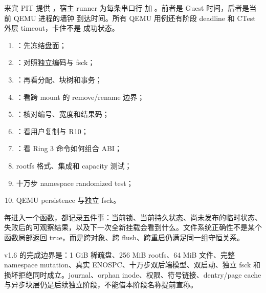 来宾 PIT 提供 ，宿主 runner 为每条串口行
加 \code{[QEMU][T+...ms]}。前者是 Guest 时间，后者是当前 QEMU 进程的墙钟
到达时间。所有 QEMU 用例还有阶段 deadline 和 CTest 外层 timeout，卡住不是
成功状态。

\par
\begin{enumerate}
  \item {}：先冻结盘面；
  \item {}：对照独立编码与 fsck；
  \item {}：再看分配、块树和事务；
  \item {}：看跨 mount 的 remove/rename 边界；
  \item {}：核对编号、宽度和结果码；
  \item {}：看用户复制与 R10；
  \item {}：看 Ring 3 命令如何组合 ABI；
  \item rootfs 格式、集成和 capacity 测试；
  \item 十万步 namespace randomized test；
  \item QEMU persistence 与独立 fsck。
\end{enumerate}

每进入一个函数，都记录五件事：当前锁、当前持久状态、尚未发布的临时状态、
失败后的可观察结果，以及下一次全新挂载会看到什么。文件系统正确性不是某个
函数局部返回 true，而是跨对象、跨 flush、跨重启仍满足同一组守恒关系。

\begin{contractbox}
v1.6 的完成边界是：1 GiB 稀疏盘、256 MiB rootfs、64 MiB 文件、完整
namespace mutation、真实 ENOSPC、十万步双后端模型、双启动、独立 fsck 和
损坏拒绝同时成立。journal、orphan inode、权限、符号链接、dentry/page
cache 与异步块层仍是后续独立阶段，不能借本阶段名称提前宣称。
\end{contractbox}
